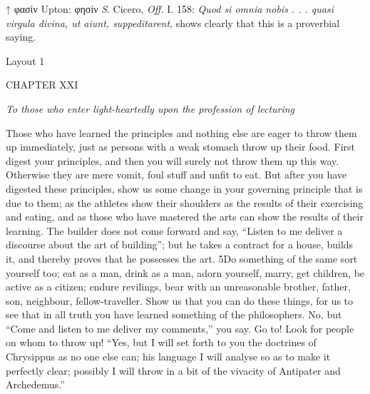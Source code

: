 

↑ φασίν Upton: φησίν \emph{S}. Cicero, \emph{Off.} I. 158: \emph{Quod si omnia nobis . . . quasi virgula divina, ut aiunt, suppeditarent}, shows clearly that this is a proverbial saying.


Layout 1

CHAPTER XXI

\emph{To those who enter light-heartedly upon the profession of lecturing}

Those who have learned the principles and nothing else are eager to throw them up immediately, just as persons with a weak stomach throw up their food. First digest your principles, and then you will surely not throw them up this way. Otherwise they are mere vomit, foul stuff and unfit to eat. But after you have digested these principles, show us some change in your governing principle that is due to them; as the athletes show their shoulders as the results of their exercising and eating, and as those who have mastered the arts can show the results of their learning. The builder does not come forward and say, ``Listen to me deliver a discourse about the art of building''; but he takes a contract for a house, builds it, and thereby proves that he possesses the art. 5Do something of the same sort yourself too; eat as a man, drink as a man, adorn yourself, marry, get children, be active as a citizen; endure revilings, bear with an unreasonable brother, father, son, neighbour, fellow-traveller. Show us that you can do these things, for us to see that in all truth you have learned something of the philosophers. No, but ``Come and listen to me deliver my comments,'' you say. Go to! Look for people on whom to throw up! ``Yes, but I will set forth to you the doctrines of Chrysippus as no one else can; his language I will analyse so as to make it perfectly clear; possibly I will throw in a bit of the vivacity of Antipater and Archedemus.''

